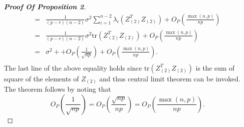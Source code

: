 \begin{proof}[\textbf{Proof Of Proposition 2}]
\begin{equation*}
\begin{aligned}
             =&
    \frac{1}{(p-r)(n-2)} \sigma^2\sum_{i=1}^{n-2}\lambda_{i}(Z_{(2)}^T Z_{(2)})
             +O_P(\frac{\max(n,p)}{np})\\
             =&
             \frac{1}{(p-r)(n-2)} \sigma^2\mathrm{tr}(Z_{(2)}^T Z_{(2)})
             +O_P(\frac{\max(n,p)}{np})\\
             =&
             \sigma^2+
                +O_P(\frac{1}{\sqrt{np}})
             +O_P(\frac{\max(n,p)}{np}).\\
         \end{aligned}
     \end{equation*}
     The last line of the above equality holds since $\mathrm{tr}(Z_{(2)}^T Z_{(2)})$ is the sum of square of the elements of $Z_{(2)}$ and thus central limit theorem can be invoked.
The theorem follows by noting that
$$
    O_{P}(\frac{1}{\sqrt{np}})=O_P(\frac{\sqrt{np}}{np})= O_P(\frac{\max (n,p)}{np}).
$$


\end{proof}
